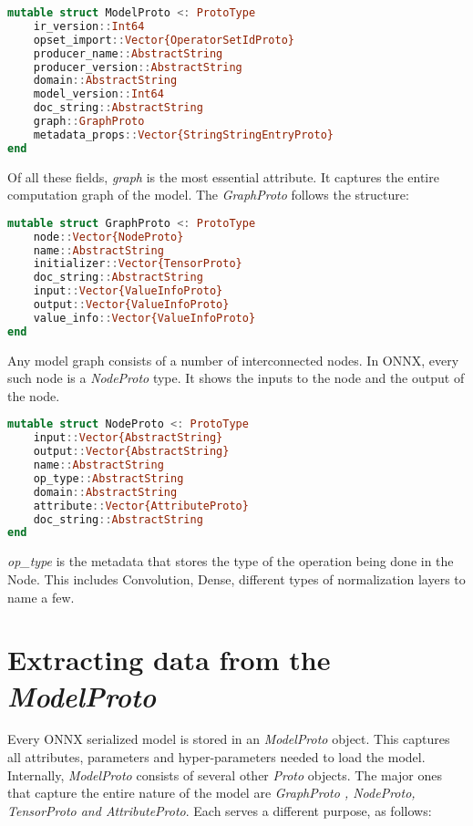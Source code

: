 \documentclass{juliacon}
\begin{document}
\begin{lstlisting}[language=julia]
mutable struct ModelProto <: ProtoType
    ir_version::Int64
    opset_import::Vector{OperatorSetIdProto}
    producer_name::AbstractString
    producer_version::AbstractString
    domain::AbstractString
    model_version::Int64
    doc_string::AbstractString
    graph::GraphProto
    metadata_props::Vector{StringStringEntryProto}
end
\end{lstlisting}{}

Of all these fields, \textit{graph} is the most essential attribute. It captures the entire
computation graph of the model. The \textit{GraphProto} follows the structure:

\begin{lstlisting}[language=julia]
mutable struct GraphProto <: ProtoType
    node::Vector{NodeProto}
    name::AbstractString
    initializer::Vector{TensorProto}
    doc_string::AbstractString
    input::Vector{ValueInfoProto}
    output::Vector{ValueInfoProto}
    value_info::Vector{ValueInfoProto}
end
\end{lstlisting}{}

Any model graph consists of a number of interconnected nodes. In ONNX, every such node is a \textit{NodeProto} type. It shows the inputs to the node and the output of the node.

\begin{lstlisting}[language=julia]
mutable struct NodeProto <: ProtoType
    input::Vector{AbstractString}
    output::Vector{AbstractString}
    name::AbstractString
    op_type::AbstractString
    domain::AbstractString
    attribute::Vector{AttributeProto}
    doc_string::AbstractString
end
\end{lstlisting}{}

\textit{op\_type} is the metadata that stores the type of the operation being done in the Node. This includes Convolution, Dense, different types of normalization layers to name a few.

\section{Extracting data from the \textit{ModelProto}}
\label{sec:documentclass}
%
Every ONNX serialized model is stored in an \textit{ModelProto} object. This captures all
attributes, parameters and hyper-parameters needed to load the model. Internally,
\textit{ModelProto} consists of several other \textit{Proto} objects. The major ones that
capture the entire nature of the model are \textit{GraphProto , NodeProto, TensorProto and
AttributeProto}. Each serves a different purpose, as follows:
\end{document}
